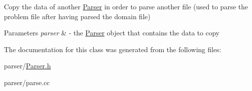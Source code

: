 Copy the data of another \hyperlink{classParser}{Parser} in order to parse another file (used to parse the problem file after having parsed the domain file) 


\begin{DoxyParams}{Parameters}
{\em parser} & -\/ the \hyperlink{classParser}{Parser} object that contains the data to copy \\
\hline
\end{DoxyParams}


The documentation for this class was generated from the following files\+:\begin{DoxyCompactItemize}
\item 
parser/\hyperlink{Parser_8h}{Parser.\+h}\item 
parser/parse.\+cc\end{DoxyCompactItemize}

